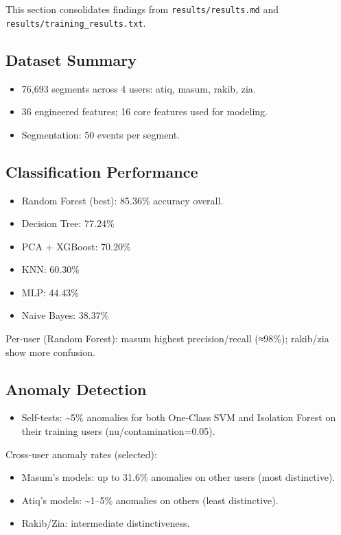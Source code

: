 \documentclass[
  12pt,
]{article}
\providecommand{\tightlist}{%
  \setlength{\itemsep}{0pt}\setlength{\parskip}{0pt}}
\begin{document}
This section consolidates findings from \texttt{results/results.md} and
\texttt{results/training\_results.txt}.

\subsection{Dataset Summary}\label{dataset-summary}

\begin{itemize}
\tightlist
\item
  76,693 segments across 4 users: atiq, masum, rakib, zia.
\item
  36 engineered features; 16 core features used for modeling.
\item
  Segmentation: 50 events per segment.
\end{itemize}

\subsection{Classification
Performance}\label{classification-performance}

\begin{itemize}
\tightlist
\item
  Random Forest (best): 85.36\% accuracy overall.
\item
  Decision Tree: 77.24\%
\item
  PCA + XGBoost: 70.20\%
\item
  KNN: 60.30\%
\item
  MLP: 44.43\%
\item
  Naive Bayes: 38.37\%
\end{itemize}

Per-user (Random Forest): masum highest precision/recall (≈98\%);
rakib/zia show more confusion.

\subsection{Anomaly Detection}\label{anomaly-detection}

\begin{itemize}
\tightlist
\item
  Self-tests: \textasciitilde5\% anomalies for both One-Class SVM and
  Isolation Forest on their training users (nu/contamination=0.05).
\end{itemize}

Cross-user anomaly rates (selected):

\begin{itemize}
\tightlist
\item
  Masum's models: up to 31.6\% anomalies on other users (most
  distinctive).
\item
  Atiq's models: \textasciitilde1--5\% anomalies on others (least
  distinctive).
\item
  Rakib/Zia: intermediate distinctiveness.
\end{itemize}
\end{document}
